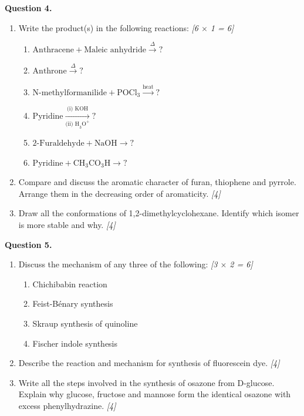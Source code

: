 \documentclass[11pt,a4paper]{article}
\newcommand{\pts}[1]{\hfill \textit{[#1]}}
\begin{document}
\noindent \textbf{Question 4.}
\begin{enumerate}[label=(\alph*)]
  \item Write the product(s) in the following reactions: \pts{6 $\times$ 1 = 6}
  \begin{enumerate}[label=(\roman*)]
    \item $\text{Anthracene} + \text{Maleic anhydride} \xrightarrow{\Delta} ?$
    \item $\text{Anthrone} \xrightarrow{\Delta} ?$
    \item $\text{N-methylformanilide} + \text{POCl}_3 \xrightarrow{\text{heat}} ?$
    \item $\text{Pyridine} \xrightarrow[\text{(ii) H}_3\text{O}^+]{\text{(i) KOH}} ?$
    \item $\text{2-Furaldehyde} + \text{NaOH} \rightarrow ?$
    \item $\text{Pyridine} + \text{CH}_3\text{CO}_3\text{H} \rightarrow ?$
  \end{enumerate}
  \item Compare and discuss the aromatic character of furan, thiophene and pyrrole. Arrange them in the decreasing order of aromaticity. \pts{4}
  \item Draw all the conformations of 1,2-dimethylcyclohexane. Identify which isomer is more stable and why. \pts{4}
\end{enumerate}

\bigskip

\noindent \textbf{Question 5.}
\begin{enumerate}[label=(\alph*)]
  \item Discuss the mechanism of any three of the following: \pts{3 $\times$ 2 = 6}
  \begin{enumerate}[label=(\roman*)]
    \item Chichibabin reaction
    \item Feist-B\'enary synthesis
    \item Skraup synthesis of quinoline
    \item Fischer indole synthesis
  \end{enumerate}
  \item Describe the reaction and mechanism for synthesis of fluorescein dye. \pts{4}
  \item Write all the steps involved in the synthesis of osazone from D-glucose. Explain why glucose, fructose and mannose form the identical osazone with excess phenylhydrazine. \pts{4}
\end{enumerate}
\end{document}
